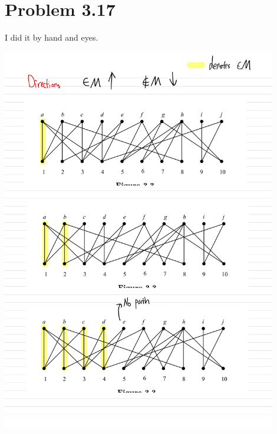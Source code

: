 \documentclass[]{article}
\theoremstyle{definition}
\begin{document}
\section{Problem 3.17}
    I did it by hand and eyes. 
    \begin{center}
        \includegraphics[width=12cm]{HW4-5.jpg}

\end{center}
\end{document}
